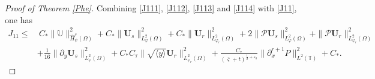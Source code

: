\documentclass[10pt,a4paper]{amsart}
\newcommand\y{{{\langle y \rangle}}}
\begin{document}
\begin{proof}[Proof of Theorem \ref{Phe}]
Combining \eqref{J111}, \eqref{J112}, \eqref{J113} and \eqref{J114} with \eqref{J11}, one has
\begin{align*}
J_{11}
\leq&~C_{*}\|\mathbb{U}\|_{\hat{H}_{\psi}^{s}(\Omega)}^{2}
     +C_{*}\|\mathbf{U}_{s}\|_{L_{\varphi}^{2}(\Omega)}^{2}
     +C_{*}\|\mathbf{U}_{r}\|_{L_{\varphi_{r}}^{2}(\Omega)}^{2}
     +2\|\mathcal{P}\mathbf{U}_{s}\|_{L_{\varphi}^{2}(\Omega)}^{2}
     +\|\mathcal{P}\mathbf{U}_{r}\|_{L_{\varphi_{r}}^{2}(\Omega)}^{2}\nonumber\\
    &+\frac{1}{16}\|\partial_{y}\mathbf{U}_{s}\|_{L_{\varphi}^{2}(\Omega)}^{2}
     +C_{*}C_{\tau}\|\sqrt{\y}\mathbf{U}_{r}\|_{L_{\varphi_{r}}^{2}(\Omega)}^{2}
     +\frac{C_{*}}{(\bar{\varsigma}+t)^{\frac{1}{2}+\varepsilon_{0}}}\|\partial_{x}^{r+1}P\|_{L^{2}(\mathbb{T})}^{2}
     +C_{*}.
\end{align*}



\end{proof}
\end{document}
